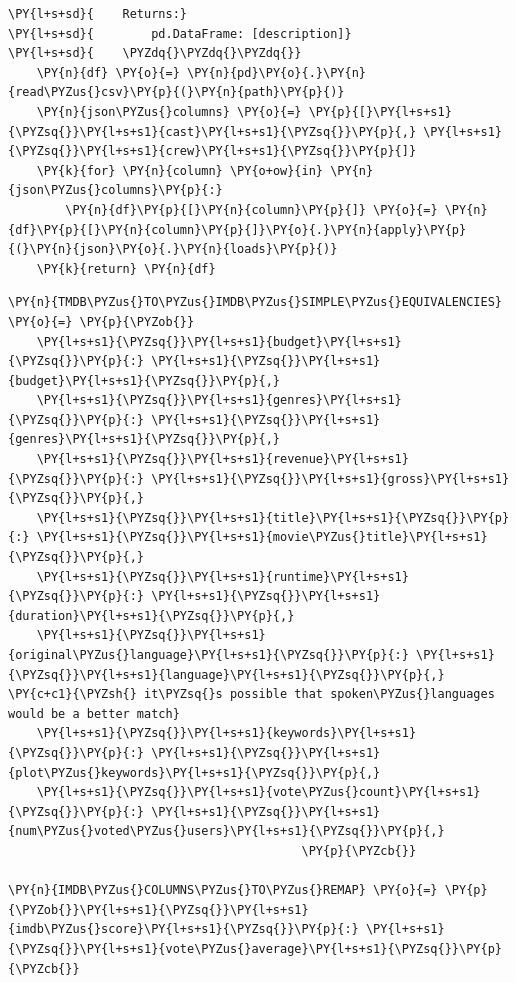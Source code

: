 \begin{tcolorbox}[breakable, size=fbox, boxrule=1pt, pad at break*=1mm,colback=cellbackground, colframe=cellborder]
\begin{Verbatim}[commandchars=\\\{\}]
\PY{l+s+sd}{    Returns:}
\PY{l+s+sd}{        pd.DataFrame: [description]}
\PY{l+s+sd}{    \PYZdq{}\PYZdq{}\PYZdq{}}
    \PY{n}{df} \PY{o}{=} \PY{n}{pd}\PY{o}{.}\PY{n}{read\PYZus{}csv}\PY{p}{(}\PY{n}{path}\PY{p}{)}
    \PY{n}{json\PYZus{}columns} \PY{o}{=} \PY{p}{[}\PY{l+s+s1}{\PYZsq{}}\PY{l+s+s1}{cast}\PY{l+s+s1}{\PYZsq{}}\PY{p}{,} \PY{l+s+s1}{\PYZsq{}}\PY{l+s+s1}{crew}\PY{l+s+s1}{\PYZsq{}}\PY{p}{]}
    \PY{k}{for} \PY{n}{column} \PY{o+ow}{in} \PY{n}{json\PYZus{}columns}\PY{p}{:}
        \PY{n}{df}\PY{p}{[}\PY{n}{column}\PY{p}{]} \PY{o}{=} \PY{n}{df}\PY{p}{[}\PY{n}{column}\PY{p}{]}\PY{o}{.}\PY{n}{apply}\PY{p}{(}\PY{n}{json}\PY{o}{.}\PY{n}{loads}\PY{p}{)}
    \PY{k}{return} \PY{n}{df}
\end{Verbatim}
\end{tcolorbox}

    \begin{tcolorbox}[breakable, size=fbox, boxrule=1pt, pad at break*=1mm,colback=cellbackground, colframe=cellborder]
\begin{Verbatim}[commandchars=\\\{\}]
\PY{n}{TMDB\PYZus{}TO\PYZus{}IMDB\PYZus{}SIMPLE\PYZus{}EQUIVALENCIES} \PY{o}{=} \PY{p}{\PYZob{}}
    \PY{l+s+s1}{\PYZsq{}}\PY{l+s+s1}{budget}\PY{l+s+s1}{\PYZsq{}}\PY{p}{:} \PY{l+s+s1}{\PYZsq{}}\PY{l+s+s1}{budget}\PY{l+s+s1}{\PYZsq{}}\PY{p}{,}
    \PY{l+s+s1}{\PYZsq{}}\PY{l+s+s1}{genres}\PY{l+s+s1}{\PYZsq{}}\PY{p}{:} \PY{l+s+s1}{\PYZsq{}}\PY{l+s+s1}{genres}\PY{l+s+s1}{\PYZsq{}}\PY{p}{,}
    \PY{l+s+s1}{\PYZsq{}}\PY{l+s+s1}{revenue}\PY{l+s+s1}{\PYZsq{}}\PY{p}{:} \PY{l+s+s1}{\PYZsq{}}\PY{l+s+s1}{gross}\PY{l+s+s1}{\PYZsq{}}\PY{p}{,}
    \PY{l+s+s1}{\PYZsq{}}\PY{l+s+s1}{title}\PY{l+s+s1}{\PYZsq{}}\PY{p}{:} \PY{l+s+s1}{\PYZsq{}}\PY{l+s+s1}{movie\PYZus{}title}\PY{l+s+s1}{\PYZsq{}}\PY{p}{,}
    \PY{l+s+s1}{\PYZsq{}}\PY{l+s+s1}{runtime}\PY{l+s+s1}{\PYZsq{}}\PY{p}{:} \PY{l+s+s1}{\PYZsq{}}\PY{l+s+s1}{duration}\PY{l+s+s1}{\PYZsq{}}\PY{p}{,}
    \PY{l+s+s1}{\PYZsq{}}\PY{l+s+s1}{original\PYZus{}language}\PY{l+s+s1}{\PYZsq{}}\PY{p}{:} \PY{l+s+s1}{\PYZsq{}}\PY{l+s+s1}{language}\PY{l+s+s1}{\PYZsq{}}\PY{p}{,}  \PY{c+c1}{\PYZsh{} it\PYZsq{}s possible that spoken\PYZus{}languages would be a better match}
    \PY{l+s+s1}{\PYZsq{}}\PY{l+s+s1}{keywords}\PY{l+s+s1}{\PYZsq{}}\PY{p}{:} \PY{l+s+s1}{\PYZsq{}}\PY{l+s+s1}{plot\PYZus{}keywords}\PY{l+s+s1}{\PYZsq{}}\PY{p}{,}
    \PY{l+s+s1}{\PYZsq{}}\PY{l+s+s1}{vote\PYZus{}count}\PY{l+s+s1}{\PYZsq{}}\PY{p}{:} \PY{l+s+s1}{\PYZsq{}}\PY{l+s+s1}{num\PYZus{}voted\PYZus{}users}\PY{l+s+s1}{\PYZsq{}}\PY{p}{,}
                                         \PY{p}{\PYZcb{}}

\PY{n}{IMDB\PYZus{}COLUMNS\PYZus{}TO\PYZus{}REMAP} \PY{o}{=} \PY{p}{\PYZob{}}\PY{l+s+s1}{\PYZsq{}}\PY{l+s+s1}{imdb\PYZus{}score}\PY{l+s+s1}{\PYZsq{}}\PY{p}{:} \PY{l+s+s1}{\PYZsq{}}\PY{l+s+s1}{vote\PYZus{}average}\PY{l+s+s1}{\PYZsq{}}\PY{p}{\PYZcb{}}
\end{Verbatim}
\end{tcolorbox}

